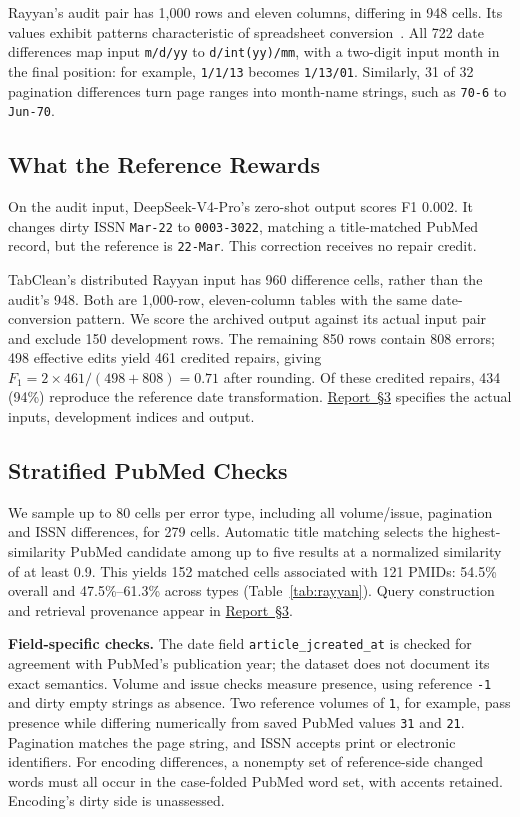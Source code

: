 \documentclass[sigconf, nonacm]{acmart}
\newcommand{\companionref}[1]{\href{https://github.com/hinsonver/CoRe-Benchmark/raw/refs/heads/main/paper/CoRe-Supplementary-Technical-Report.pdf\#nameddest=companion-#1}{Report~\S#1}}
\begin{document}
Rayyan's audit pair has 1,000 rows and eleven columns, differing in 948 cells. Its
values exhibit patterns characteristic of spreadsheet conversion~\cite{ziemann2016gene}.
All 722 date differences map input \texttt{m/d/yy} to \texttt{d/int(yy)/mm}, with a two-digit
input month in the final position: for example, \texttt{1/1/13} becomes \texttt{1/13/01}.
Similarly, 31 of 32 pagination differences turn page ranges into month-name strings, such as
\texttt{70-6} to \texttt{Jun-70}.

\subsection{What the Reference Rewards}\label{sec:rayyan-rewards}

On the audit input, DeepSeek-V4-Pro's zero-shot output scores F1 0.002. It changes dirty ISSN
\texttt{Mar-22} to \texttt{0003-3022}, matching a title-matched PubMed record, but the reference
is \texttt{22-Mar}. This correction receives no repair credit.

TabClean's distributed Rayyan input has 960 difference cells, rather than the audit's 948.
Both are 1,000-row, eleven-column tables with the same date-conversion pattern. We score the
archived output against its actual input pair and exclude 150 development rows. The remaining
850 rows contain 808 errors; 498 effective edits yield 461 credited repairs, giving
$F_1=2\times461/(498+808)=0.71$ after rounding. Of these credited repairs, 434 (94\%) reproduce
the reference date transformation. \companionref{3} specifies the actual inputs, development
indices and output.

\subsection{Stratified PubMed Checks}\label{sec:rayyan-audit}

We sample up to 80 cells per error type, including all volume/issue, pagination and ISSN
differences, for 279 cells. Automatic title matching selects the highest-similarity PubMed
candidate among up to five results at a normalized similarity of at least 0.9. This yields
152 matched cells associated with 121 PMIDs: 54.5\% overall and 47.5\%--61.3\% across types
(Table~\ref{tab:rayyan}). Query construction and retrieval provenance appear in \companionref{3}.

\textbf{Field-specific checks.} The date field \texttt{article\_jcreated\_at} is checked for
agreement with PubMed's publication year; the dataset does not document its exact semantics.
Volume and issue checks measure presence, using reference \texttt{-1} and dirty empty strings
as absence. Two reference volumes of \texttt{1}, for example, pass presence while differing
numerically from saved PubMed values \texttt{31} and \texttt{21}. Pagination matches the page
string, and ISSN accepts print or electronic identifiers. For encoding differences, a nonempty
set of reference-side changed words must all occur in the case-folded PubMed
word set, with accents retained. Encoding's dirty side is unassessed.
\end{document}
